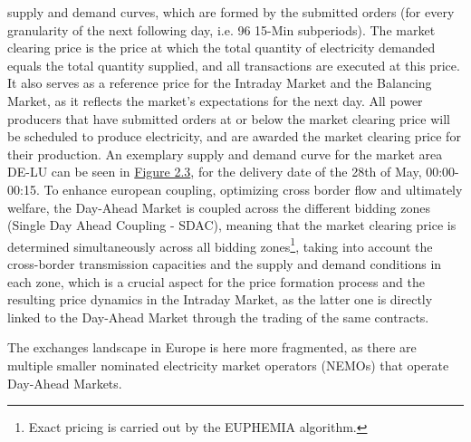 \documentclass[12pt,a4paper]{cau_thesis}
\begin{document}
supply and demand curves, which are formed by the submitted orders
(for every granularity of the next following day, i.e. 96 15-Min
subperiods). The market clearing price is the price at which the
total quantity of electricity demanded equals the total quantity
supplied, and all transactions are executed at this price. It also
serves as a reference price for the Intraday Market and the Balancing
Market, as it reflects the market's expectations for the next day.
All power producers that have submitted orders at or below the market
clearing price will be scheduled to produce electricity, and are
awarded the market clearing price for their production. An exemplary
supply and demand curve for the market area DE-LU can be seen in
\hyperref[fig:day_ahead_curves]{Figure 2.3}, for the delivery date of
the 28th of May, 00:00-00:15. To enhance european coupling,
optimizing cross border flow and ultimately welfare, the Day-Ahead
Market is coupled across the different bidding zones (Single Day
Ahead Coupling - SDAC), meaning that the market clearing price is
determined simultaneously across all bidding zones\footnote{Exact
    pricing is carried out by the EUPHEMIA algorithm.}, taking into
account the cross-border transmission capacities and the supply and
demand conditions in each zone, which is a crucial aspect for the
price formation process and the resulting price dynamics in the
Intraday Market, as the latter one is directly linked to the
Day-Ahead Market through the trading of the same contracts.

The exchanges landscape in Europe is here more fragmented, as there
are multiple smaller nominated electricity market operators (NEMOs)
that operate Day-Ahead Markets.
\end{document}
